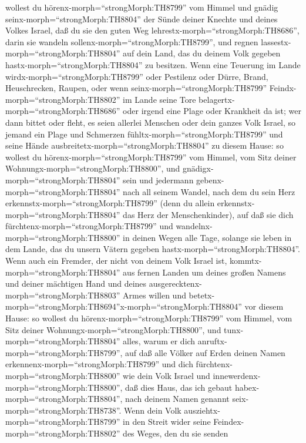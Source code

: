 wollest du hörenx-morph=``strongMorph:TH8799'' vom Himmel und gnädig
seinx-morph=``strongMorph:TH8804'' der Sünde deiner Knechte und deines
Volkes Israel, daß du sie den guten Weg
lehrestx-morph=``strongMorph:TH8686'', darin sie wandeln
sollenx-morph=``strongMorph:TH8799'', und regnen
lassestx-morph=``strongMorph:TH8804'' auf dein Land, das du deinem Volk
gegeben hastx-morph=``strongMorph:TH8804'' zu besitzen. 
Wenn eine Teuerung im Lande wirdx-morph=``strongMorph:TH8799'' oder
Pestilenz oder Dürre, Brand, Heuschrecken, Raupen, oder wenn
seinx-morph=``strongMorph:TH8799'' Feindx-morph=``strongMorph:TH8802''
im Lande seine Tore belagertx-morph=``strongMorph:TH8686'' oder irgend
eine Plage oder Krankheit da ist;  wer dann bittet oder
fleht, es seien allerlei Menschen oder dein ganzes Volk Israel, so
jemand ein Plage und Schmerzen fühltx-morph=``strongMorph:TH8799'' und
seine Hände ausbreitetx-morph=``strongMorph:TH8804'' zu diesem Hause:
 so wollest du hörenx-morph=``strongMorph:TH8799'' vom
Himmel, vom Sitz deiner Wohnungx-morph=``strongMorph:TH8800'', und
gnädigx-morph=``strongMorph:TH8804'' sein und jedermann
gebenx-morph=``strongMorph:TH8804'' nach all seinem Wandel, nach dem du
sein Herz erkennstx-morph=``strongMorph:TH8799'' (denn du allein
erkennstx-morph=``strongMorph:TH8804'' das Herz der Menschenkinder),
 auf daß sie dich fürchtenx-morph=``strongMorph:TH8799''
und wandelnx-morph=``strongMorph:TH8800'' in deinen Wegen alle Tage,
solange sie leben in dem Lande, das du unsern Vätern gegeben
hastx-morph=``strongMorph:TH8804''.  Wenn auch ein Fremder,
der nicht von deinem Volk Israel ist,
kommtx-morph=``strongMorph:TH8804'' aus fernen Landen um deines großen
Namens und deiner mächtigen Hand und deines
ausgerecktenx-morph=``strongMorph:TH8803'' Armes willen und
betetx-morph=``strongMorph:TH8694''x-morph=``strongMorph:TH8804'' vor
diesem Hause:  so wollest du
hörenx-morph=``strongMorph:TH8799'' vom Himmel, vom Sitz deiner
Wohnungx-morph=``strongMorph:TH8800'', und
tunx-morph=``strongMorph:TH8804'' alles, warum er dich
anruftx-morph=``strongMorph:TH8799'', auf daß alle Völker auf Erden
deinen Namen erkennenx-morph=``strongMorph:TH8799'' und dich
fürchtenx-morph=``strongMorph:TH8800'' wie dein Volk Israel und
innewerdenx-morph=``strongMorph:TH8800'', daß dies Haus, das ich gebaut
habex-morph=``strongMorph:TH8804'', nach deinem Namen genannt
seix-morph=``strongMorph:TH8738''.  Wenn dein Volk
ausziehtx-morph=``strongMorph:TH8799'' in den Streit wider seine
Feindex-morph=``strongMorph:TH8802'' des Weges, den du sie senden
